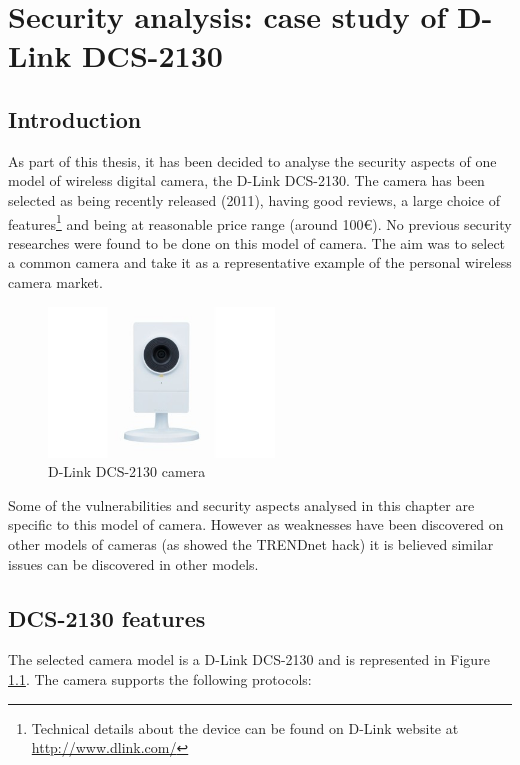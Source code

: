 
\chapter{Security analysis: case study of D-Link DCS-2130}
\label{chap:cam-dcs}

\section*{Introduction}
\label{sec:dcs-intro}

As part of this thesis, it has been decided to analyse the security aspects of one model of wireless digital camera, the D-Link DCS-2130.
The camera has been selected as being recently released (2011), having good reviews, a large choice of features\footnote{Technical details about the device can be found on D-Link website at \url{http://www.dlink.com/}} and being at reasonable price range (around 100€).
No previous security researches were found to be done on this model of camera.
The aim was to select a common camera and take it as a representative example of the personal wireless camera market.\\

\begin{figure}[h]
  \centering
  \includegraphics[width=6cm]{images/dcs2130.png}
  \caption{D-Link DCS-2130 camera}
  \label{fig:dcs2130}
\end{figure}

Some of the vulnerabilities and security aspects analysed in this chapter are specific to this model of camera.
However as weaknesses have been discovered on other models of cameras (as showed the TRENDnet hack) it is believed similar issues can be discovered in other models.\\

\section{DCS-2130 features}
\label{sec:dcs-pres}

The selected camera model is a D-Link DCS-2130 and is represented in Figure \ref{fig:dcs2130}. The camera supports the following protocols:\\

